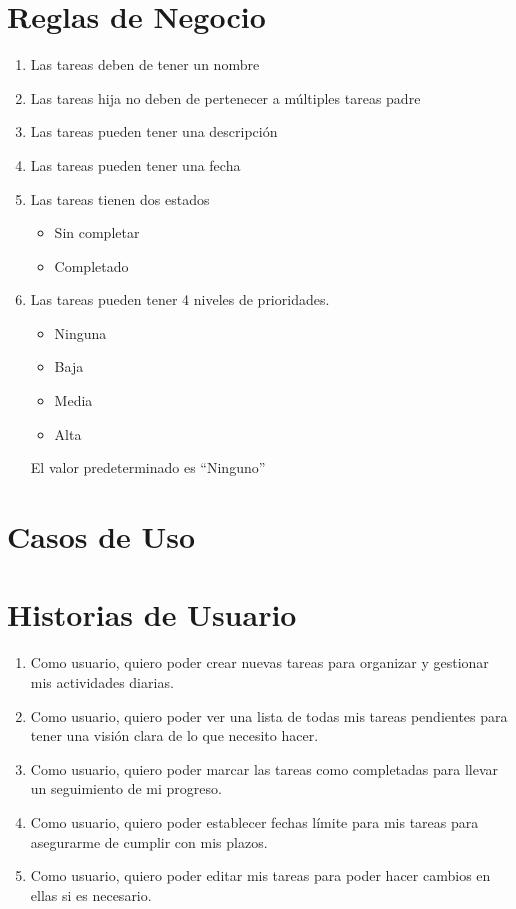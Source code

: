 \section{Reglas de Negocio}
\begin{enumerate}[start=1, label={RN\arabic*.}]
  \item Las tareas deben de tener un nombre \label{rn:nombre}
  \item Las tareas hija no deben de pertenecer a m\'ultiples tareas padre \label{rn:thija}
  \item Las tareas pueden tener una descripci\'on \label{rn:desc}
  \item Las tareas pueden tener una fecha \label{rn:fecha}
  \item Las tareas tienen dos estados \label{rn:estado}
    \begin{itemize}
      \item Sin completar
      \item Completado
    \end{itemize}
  \item Las tareas pueden tener 4 niveles de prioridades. \label{rn:prioridad}
    \begin{itemize}
      \item Ninguna
      \item Baja
      \item Media
      \item Alta
    \end{itemize}
    El valor predeterminado es ``Ninguno''
\end{enumerate}
	\section{Casos de Uso}
	 
    
    \section{Historias de Usuario}
    \begin{enumerate}[start=1, label=HU\arabic*.]
        \item Como usuario, quiero poder crear nuevas tareas para organizar y gestionar mis actividades diarias.
        
        \item Como usuario, quiero poder ver una lista de todas mis tareas pendientes para tener una visión clara de lo que necesito hacer.
        
        \item Como usuario, quiero poder marcar las tareas como completadas para llevar un seguimiento de mi progreso.
        
        \item Como usuario, quiero poder establecer fechas límite para mis tareas para asegurarme de cumplir con mis plazos.

        \item Como usuario, quiero poder editar mis tareas para poder hacer cambios en ellas si es necesario.
    \end{enumerate}
